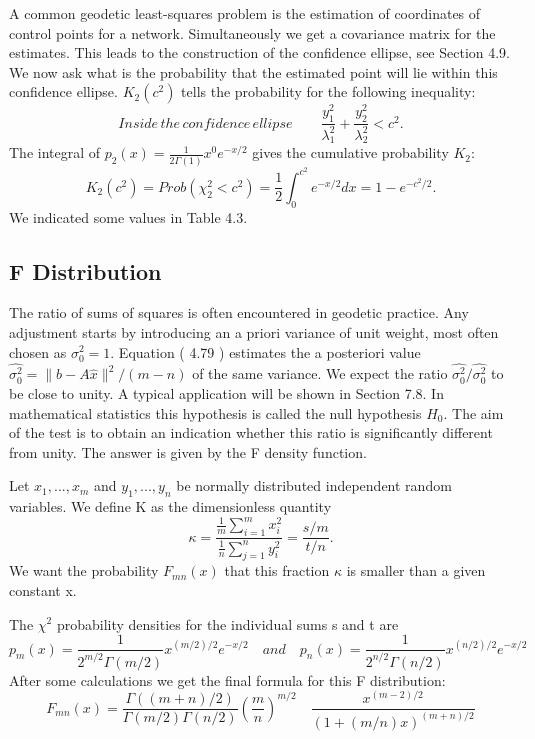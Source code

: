 	A common geodetic least-squares problem is the estimation of coordinates of control points
	for a network. Simultaneously we get a covariance matrix for the estimates. This leads
	to the construction of the confidence ellipse, see Section 4.9. We now ask what is the
	probability that the estimated point will lie within this confidence ellipse. $K_2(c^2)$ tells the	probability for the following inequality:
	\begin{equation*}
	Inside\, the\, confidence\, ellipse \qquad
	\frac{y^2_1}{\lambda^2_1}+\frac{y^2_2}{\lambda^2_2}<c^2.
	\end{equation*}
	The integral of $p_2(x)=\frac{1}{2\Gamma (1)}x^0e^{-x/2}$ gives the cumulative probability $K_2$:
	\begin{equation}
	K_2(c^2)= Prob(\chi^2_2<c^2)=\frac{1}{2}\int^{c^2}_0e^{-x/2}dx=1-e^{-c^2/2}.
	\end{equation}
	We indicated some values in Table 4.3.
	
	\subsection{F Distribution}
	The ratio of sums of squares is often encountered in geodetic practice. Any adjustment
	starts by introducing an a priori variance of unit weight, most often chosen as $\sigma^2_0=1$.
	Equation ( 4.79 ) estimates the a posteriori value $\hat{\sigma^2_0}=\|b-A\hat{x}\|^2/(m-n)$ of the same variance. We expect the ratio $\hat{\sigma^2_0}/\hat{\sigma^2_0}$ to be close to unity. A typical application will be shown in Section 7.8. In mathematical statistics this hypothesis is called the null hypothesis $H_0$. The aim of the test is to obtain an indication whether this ratio is significantly different from unity. The answer is given by the F density function.
	
	Let $x_1,...,x_m$ and $y_1,...,y_n$ be normally distributed independent random variables. We define K as the dimensionless quantity
	\begin{equation}
	\kappa =\frac{\frac{1}{m}\sum^{m}_{i=1}x^2_i}{\frac{1}{n}\sum_{j=1}^{n}y^2_i}=\frac{s/m}{t/n}.
	\end{equation}
	We want the probability $F_{mn}(x)$ that this fraction $\kappa$ is smaller than a given constant x.
	
	The $\chi^2$ probability densities for the individual sums s and t are
	\begin{equation*}
	p_m(x)=\frac{1}{2^{m/2}\Gamma(m/2)}x^{(m/2)/2}e^{-x/2} \quad and \quad
	p_n(x)=\frac{1}{2^{n/2}\Gamma(n/2)}x^{(n/2)/2}e^{-x/2}
	\end{equation*}
	After some calculations we get the final formula for this F distribution:
	\begin{equation}
	F_{mn}(x)=\frac{\Gamma((m+n)/2)}{\Gamma(m/2)\Gamma(n/2)}(\frac{m}{n})^{m/2} 
	\quad
	\frac{x^{(m-2)/2}}{(1+(m/n)x)^{(m+n)/2}}
	\end{equation}